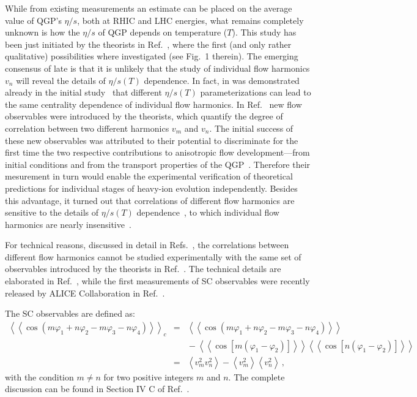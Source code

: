\documentclass[ALICE,manyauthors]{cernphprep}
\begin{document}
While from existing measurements an estimate can be placed on the average value of QGP's $\eta/s$, both at RHIC and LHC energies, what remains completely unknown is how the $\eta/s$ of QGP depends on temperature ($T$). This study has been just initiated by the theorists in Ref.~\cite{Niemi:2015qia}, where the first (and only rather qualitative) possibilities where investigated (see Fig.~1 therein). The emerging consensus of late is that it is unlikely that the study of individual flow harmonics $v_n$ will reveal the details of $\eta/s(T)$ dependence. In fact, in was demonstrated already in the initial study~\cite{Niemi:2015qia} that different $\eta/s(T)$ parameterizations can lead to the same centrality dependence of individual flow harmonics. In Ref.~\cite{Niemi:2012aj} new flow observables were introduced by the theorists, which quantify the degree of correlation between two different harmonics $v_m$ and $v_n$. The initial success of these new observables was attributed to their potential to discriminate for the first time the two respective contributions to anisotropic flow development---from initial conditions and from the transport properties of the QGP~\cite{Niemi:2012aj}. Therefore their mesurement in turn would enable the experimental verification of theoretical predictions for individual stages of heavy-ion evolution independently. Besides this advantage, it turned out that correlations of different flow harmonics are sensitive to the details of $\eta/s(T)$ dependence~\cite{ALICE:2016kpq}, to which individual flow harmonics are nearly insensitive~\cite{Niemi:2015qia}. 
 
For technical reasons, discussed in detail in Refs.~\cite{ALICE:2016kpq,Bilandzic:2013kga}, the correlations between different flow harmonics cannot be studied experimentally with the same set of observables introduced by the theorists in Ref.~\cite{Niemi:2012aj}. The technical details are elaborated in Ref.~\cite{Bilandzic:2013kga}, while the first measurements of SC observables were recently released by ALICE Collaboration in Ref.~\cite{ALICE:2016kpq}.

The SC observables are defined as:
\begin{eqnarray}
\left<\left<\cos(m\varphi_1\!+\!n\varphi_2\!-\!m\varphi_3-\!n\varphi_4)\right>\right>_c &=& \left<\left<\cos(m\varphi_1\!+\!n\varphi_2\!-\!m\varphi_3-\!n\varphi_4)\right>\right>\nonumber\\
&&{}-\left<\left<\cos[m(\varphi_1\!-\!\varphi_2)]\right>\right>\left<\left<\cos[n(\varphi_1\!-\!\varphi_2)]\right>\right>\nonumber\\
&=&\left<v_{m}^2v_{n}^2\right>-\left<v_{m}^2\right>\left<v_{n}^2\right>\,,%
\label{eq:4p_cumulant}
\end{eqnarray}
%
with the condition $m\neq n$ for two positive integers $m$ and $n$. The complete discussion can be found in Section IV C of Ref.~\cite{Bilandzic:2013kga}.
\end{document}
